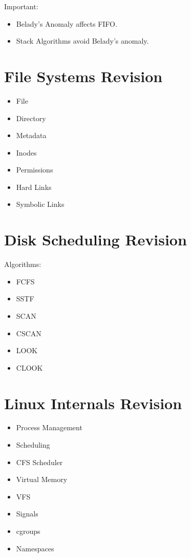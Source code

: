 Important:

\begin{itemize}
\item Belady's Anomaly affects FIFO.
\item Stack Algorithms avoid Belady's anomaly.
\end{itemize}

\section{File Systems Revision}

\begin{itemize}
\item File
\item Directory
\item Metadata
\item Inodes
\item Permissions
\item Hard Links
\item Symbolic Links
\end{itemize}

\section{Disk Scheduling Revision}

Algorithms:

\begin{itemize}
\item FCFS
\item SSTF
\item SCAN
\item CSCAN
\item LOOK
\item CLOOK
\end{itemize}

\section{Linux Internals Revision}

\begin{itemize}
\item Process Management
\item Scheduling
\item CFS Scheduler
\item Virtual Memory
\item VFS
\item Signals
\item cgroups
\item Namespaces
\end{itemize}

